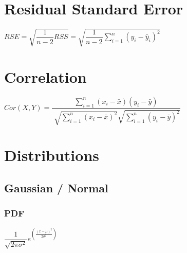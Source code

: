 \section{Residual Standard Error}
\begin{itemize}
\itemt \( RSE = \sqrt{\dfrac{1}{n-2}RSS} =\sqrt{\dfrac{1}{n-2}\sum\limits_{i=1}^n (y_i - \hat{y}_i)^2} \)
\end{itemize}



\section{Correlation}
\begin{itemize}
\itemt \( {Cor}(X,Y) = \dfrac{\sum\limits_{i=1}^n (x_i - \bar{x})(y_i - \bar{y})}{\sqrt[]{\sum\limits_{i=1}^n (x_i - \bar{x})^2}\sqrt{\sum\limits_{i=1}^n (y_i - \bar{y})^2}} \)
\end{itemize}



\section{Distributions}
\subsection{Gaussian / Normal}
\subsubsection{PDF}
\begin{itemize}
\itemt \( \dfrac{1}{\sqrt{2\pi\sigma^2}} e^{\left(\frac{(x-\mu)^2}{2\sigma^2}\right)} \)
\end{itemize}



